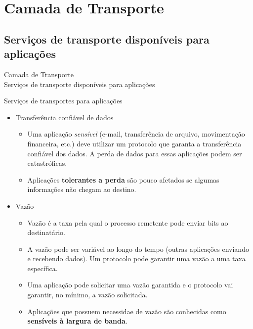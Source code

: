 \documentclass{libs/ufc_format}
\begin{document}
\section{Camada de Transporte}

\subsection{Serviços de transporte disponíveis para aplicações}

\begin{frame}{}
    \centering
    \Large
    Camada de Transporte\\
    \large
    Serviços de transporte disponíveis para aplicações
\end{frame}

\begin{frame}{Serviços de transportes para aplicações}
    \begin{itemize}
        \justifying
        \item Transferência confiável de dados
            \begin{itemize}
                \justifying
                \item<1> Uma aplicação \textit{sensível} (e-mail, transferência de arquivo, movimentação financeira, etc.) deve utilizar um protocolo que garanta a transferência confiável dos dados. A perda de dados para essas aplicações podem ser catastróficas.
                \item<1> Aplicações \textbf{tolerantes a perda} são pouco afetados se algumas informações não chegam ao destino.
            \end{itemize}
        \item<2-> Vazão
            \begin{itemize}
                \justifying
                \item<2> Vazão é a taxa pela qual o processo remetente pode enviar bits ao destinatário.
                \item<2> A vazão pode ser variável ao longo do tempo (outras aplicações enviando e recebendo dados). Um protocolo pode garantir uma vazão a uma taxa específica.
                \item<2> Uma aplicação pode solicitar uma vazão garantida e o protocolo vai garantir, no mínimo, a vazão solicitada.
                \item<2> Aplicações que possuem necessidae de vazão são conhecidas como \textbf{sensíveis à largura de banda}.
            \end{itemize}
    \end{itemize}
\end{frame}
\end{document}
